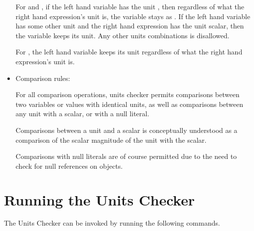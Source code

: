 \begin{itemize}
For \code{*=} and \code{/=}, if the left hand variable has the unit
, then regardless of what the right hand expression's unit
is, the variable stays as . If the left hand variable has
some other unit and the right hand expression has the unit scalar, then the
variable keeps its unit. Any other units combinations is disallowed.

For \code{\%=}, the left hand variable keeps its unit regardless of what the
right hand expression's unit is.

\item
Comparison rules:

For all comparison operations, units checker permits comparisons between two
variables or values with identical units, as well as comparisons between any
unit with a scalar, or with a null literal.

Comparisons between a unit and a scalar is conceptually understood as a
comparison of the scalar magnitude of the unit with the scalar.

Comparisons with null literals are of course permitted due to the need to
check for null references on objects.
\end{itemize}


\section{Running the Units Checker\label{units-running}}

The Units Checker can be invoked by running the following commands.

